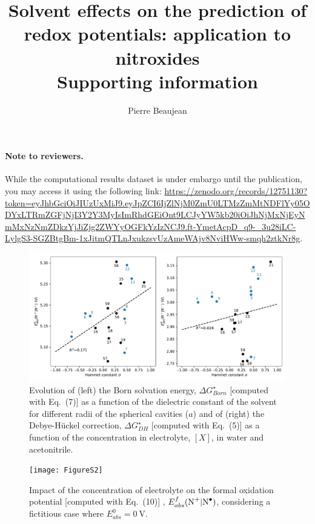 \documentclass[11pt,a4paper]{article}
\title{Solvent effects on the prediction of redox potentials: application to nitroxides\\ Supporting information}
\author{Pierre Beaujean}
\begin{document}
\maketitle


\renewcommand{\thetable}{S\arabic{table}}
\renewcommand{\thefigure}{S\arabic{figure}}

\paragraph{Note to reviewers.} While the computational results dataset is under embargo until the publication, you may access it using the following link: \url{https://zenodo.org/records/12751130?token=eyJhbGciOiJIUzUxMiJ9.eyJpZCI6IjZlNjM0ZmU0LTMzZmMtNDFlYy05ODYxLTRmZGFjNjI3Y2Y3MyIsImRhdGEiOnt9LCJyYW5kb20iOiJhNjMxNjEyNmMxNzNmZDkzYjJiZjg2ZWYyOGFkYzIzNCJ9.ft-YmetAcpD_q9-_3u28iLC-LylgS3-SGZBtgBm-1xJitmQTLnJxukzsvUzAmeWAjv8NviHWw-smqh2ztkNr8g}. 

\begin{figure}[!h]
	\centering
	\includegraphics [width=\linewidth]{FigureS1}
	\caption{Evolution of (left) the Born solvation energy, $\Delta G^\star_{Born}$ [computed with Eq.~(7)] as a function of the dielectric constant of the solvent for different radii of  the spherical cavities ($a$) and of (right) the Debye-Hückel correction, $\Delta G^\star_{DH}$  [computed with Eq.~(5)] as a function of the concentration in electrolyte, $[X]$, in water and acetonitrile.}
\end{figure}

\begin{figure}[!h]
\centering
\texttt{[image: FigureS2]}
\caption{Impact of the concentration of electrolyte on the formal oxidation potential [computed with Eq.~(10)] , $E^f_{abs}(\ce{N+}|\ce{N^.})$, considering a fictitious case where $E^0_{abs} = \SI{0}{\volt}$.}
\end{figure}
\end{document}
